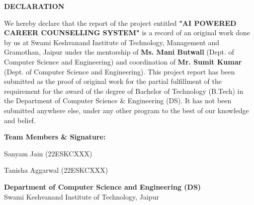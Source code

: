 \begin{center}
\LARGE{\textbf{DECLARATION}}
\end{center}

\vspace{1cm}
\linespread{1.3}
\large
We hereby declare that the report of the project entitled \textbf{"AI POWERED CAREER COUNSELLING SYSTEM"} is a record of an original work done by us at Swami Keshvanand Institute of Technology, Management and Gramothan, Jaipur under the mentorship of \textbf{Ms. Mani Butwall} (Dept. of Computer Science and Engineering) and coordination of \textbf{Mr. Sumit Kumar} (Dept. of Computer Science and Engineering). This project report has been submitted as the proof of original work for the partial fulfillment of the requirement for the award of the degree of Bachelor of Technology (B.Tech) in the Department of Computer Science \& Engineering (DS). It has not been submitted anywhere else, under any other program to the best of our knowledge and belief.

\vspace{2cm}
\noindent
\textbf{Team Members \& Signature:}

\vspace{1.5cm}
\noindent
Sanyam Jain (22ESKCXXX) \dotfill

\vspace{1cm}
\noindent
Tanisha Aggarwal (22ESKCXXX) \dotfill

\vspace{1.5cm}
\noindent
\textbf{Department of Computer Science and Engineering (DS)} \\
Swami Keshvanand Institute of Technology, Jaipur
